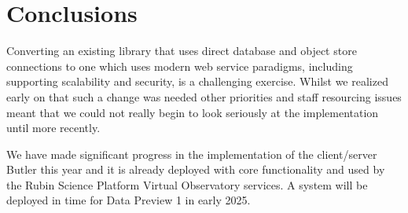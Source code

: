 \section{Conclusions}

Converting an existing library that uses direct database and object store connections to one which uses modern web service paradigms, including supporting scalability and security, is a challenging exercise.
Whilst we realized early on that such a change was needed \cite{DMTN-169,DMTN-176} other priorities and staff resourcing issues meant that we could not really begin to look seriously at the implementation until more recently. \cite{DMTN-282,DMTN-283}

We have made significant progress in the implementation of the client/server Butler this year and it is already deployed with core functionality and used by the Rubin Science Platform Virtual Observatory services. \cite{DMTN-208}
A system will be deployed in time for Data Preview 1 in early 2025. \cite{RTN-011}
